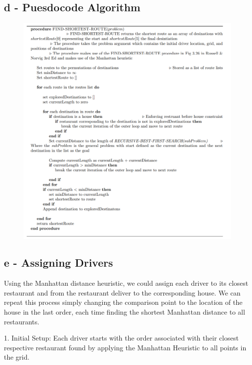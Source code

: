 \documentclass{article}
\begin{document}
\subsection{d - Puesdocode Algorithm}


\begin{figure}[h!]
\includegraphics[width=15cm]{QuestionDPuesdoCode.png}
\centering
\end{figure}


\subsection{e - Assigning Drivers}

Using the Manhattan distance heuristic, we could assign each driver to its closest restaurant and from the restaurant deliver to the corresponding house. We can repeat this process simply changing the comparison point to the location of the house in the last order, each time finding the shortest Manhattan distance to all restaurants. \newline

1. Initial Setup: Each driver starts with the order associated with their closest respective restaurant found by applying the Manhattan Heuristic to all points in the grid. \newline
\end{document}
